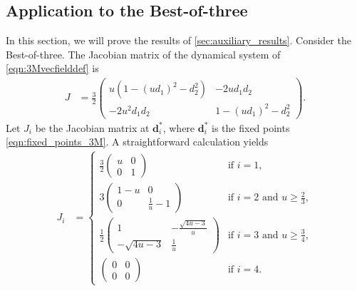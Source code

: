 \documentclass[letterpaper,11pt]{article}
\begin{document}
\subsection{Application to the Best-of-three} \label{sec:apply_to_3M}
In this section, we will prove the results of \cref{sec:auxiliary_results}. 
Consider the Best-of-three.
The Jacobian matrix of the dynamical system of \cref{eqn:3Mvecfielddef} is
\begin{align} \label{eqn:general_Jacobian_3M}
J&=\frac{3}{2}\left( \begin{array}{cc}
u(1-(ud_1)^2-d_2^2) & -2ud_1d_2 \\
-2u^2d_1d_2 & 1-(ud_1)^2-d_2^2
\end{array} \right).
\end{align}
Let $J_i$ be the Jacobian matrix at $\mathbf{d}^*_i$, where $\mathbf{d}^*_i$ is the fixed points \cref{eqn:fixed_points_3M}.
A straightforward calculation yields
\begin{align}  \label{eqn:Jacobian_3M}
J_i&=\begin{cases}
\frac{3}{2}\left( \begin{array}{cc}
u & 0 \\
0 & 1
\end{array} \right) & \text{if $i=1$}, \\
3\left( \begin{array}{cc}
1-u & 0 \\
0 & \frac{1}{u}-1
\end{array} \right) & \text{if $i=2$ and $u\geq \frac{2}{3}$}, \\
\frac{1}{2}\left( \begin{array}{cc}
1 & -\frac{\sqrt{4u-3}}{u} \\
-\sqrt{4u-3} & \frac{1}{u}
\end{array} \right) & \text{if $i=3$ and $u\geq \frac{3}{4}$}, \\
\left( \begin{array}{cc}
0 & 0 \\
0 & 0
\end{array} \right) & \text{if $i=4$}.
\end{cases}
\end{align}
\end{document}
